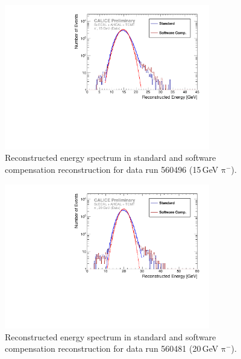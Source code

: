 \documentclass[twoside,a4paper,12pt]{article}
\newcommand\piminus{\(\mathrm{\pi^-}\)}
\begin{document}
\begin{appendix}
\begin{figure}[t]
\begin{center}
\includegraphics[width=0.8\textwidth]{fig/pion/SC/ERec_classic_SC_560496_data.pdf}
\caption{Reconstructed energy spectrum in standard and software compensation reconstruction for data run 560496 (15\,GeV \piminus).}
\label{fig:erec_pi_15gev}
\end{center}
\end{figure}

\begin{figure}[b]
\begin{center}
\includegraphics[width=0.8\textwidth]{fig/pion/SC/ERec_classic_SC_560481_data.pdf}
\caption{Reconstructed energy spectrum in standard and software compensation reconstruction for data run 560481 (20\,GeV \piminus).}
\label{fig:erec_pi_20gev}
\end{center}
\end{figure}


\end{appendix}
\end{document}

